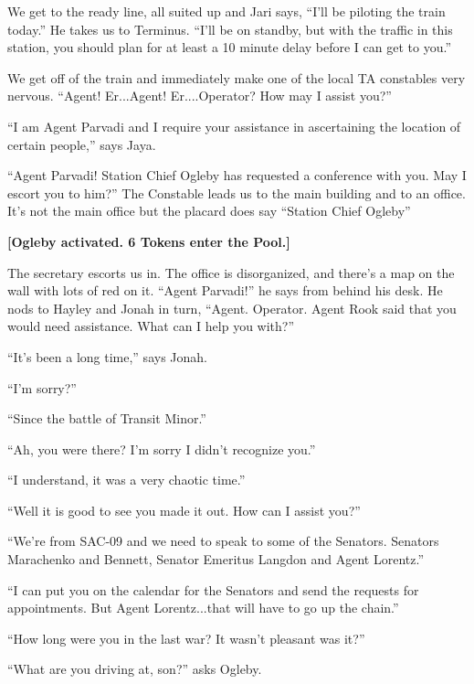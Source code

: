 
We get to the ready line, all suited up and Jari says, ``I'll be piloting the train today.''  He takes us to Terminus.  ``I'll be on standby, but with the traffic in this station, you should plan for at least a 10 minute delay before I can get to you.''



We get off of the train and immediately make one of the local TA constables very nervous.  ``Agent!  Er...Agent!  Er....Operator?  How may I assist you?''

``I am Agent Parvadi and I require your assistance in ascertaining the location of certain people,'' says Jaya.

``Agent Parvadi!  Station Chief Ogleby has requested a conference with you.  May I escort you to him?''  The Constable leads us to the main building and to an office. It's not the main office but the placard does say ``Station Chief Ogleby''



\textbf{{[}Ogleby activated.  6 Tokens enter the Pool.{]}}



The secretary escorts us in.  The office is disorganized, and there's a map on the wall with lots of red on it.  ``Agent Parvadi!'' he says from behind his desk.  He nods to Hayley and Jonah in turn, ``Agent.  Operator.  Agent Rook said that you would need assistance.  What can I help you with?''

``It's been a long time,'' says Jonah.

``I'm sorry?''

``Since the battle of Transit Minor.'' 

``Ah, you were there?  I'm sorry I didn't recognize you.''

``I understand, it was a very chaotic time.''

``Well it is good to see you made it out.  How can I assist you?''

``We're from SAC-09 and we need to speak to some of the Senators.  Senators Marachenko and Bennett, Senator Emeritus Langdon and Agent Lorentz.''

``I can put you on the calendar for the Senators and send the requests for appointments.  But Agent Lorentz...that will have to go up the chain.''

``How long were you in the last war?  It wasn't pleasant was it?''

``What are you driving at, son?'' asks Ogleby.

